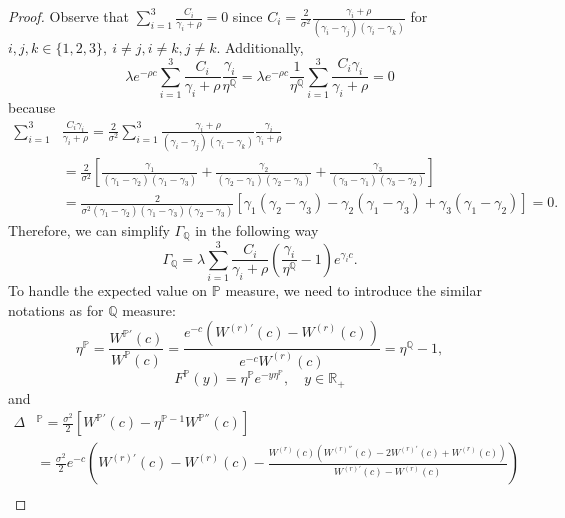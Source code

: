 \documentclass[10pt,a4paper]{amsart}
\def\P{{\mathbb{P}}}
\def\Q{{\mathbb{Q}}}
\def\P{{\mathbb P}} \def\le{\left} \def\ri{\right} \def\i{\infty}
\begin{document}
\begin{proof}
			Observe that $\sum_{i=1}^3 \frac{C_i}{\gamma_i+\rho}=0$ since $C_i = \frac{2}{\sigma^2} \frac{\gamma_i + \rho}{(\gamma_i-\gamma_j)(\gamma_i-\gamma_k)}$ for $i,j,k \in \{1,2,3\},\ i\neq j, i\neq k, j\neq k$.
			Additionally,
			\begin{equation}\label{sum_Ci_0}
				\lambda e^{-\rho c} \sum_{i=1}^{3} \frac{C_i}{\gamma_i+\rho} \frac{\gamma_i}{\eta^\Q} = \lambda e^{-\rho c} \frac{1}{\eta^\Q}\sum_{i=1}^{3} \frac{C_i \gamma_i}{\gamma_i + \rho} = 0
			\end{equation}
			because
			\begin{align*}
				\sum_{i=1}^{3} &\frac{C_i \gamma_i}{\gamma_i + \rho} = \frac{2}{\sigma^2}\sum_{i=1}^{3} \frac{\gamma_i + \rho}{(\gamma_i-\gamma_j)(\gamma_i-\gamma_k)} \frac{\gamma_i}{\gamma_i + \rho} \\
				\nonumber	&= \frac{2}{\sigma^2} \left[ \frac{\gamma_1}{(\gamma_1-\gamma_2)(\gamma_1-\gamma_3)} + \frac{\gamma_2}{(\gamma_2-\gamma_1)(\gamma_2-\gamma_3)} + \frac{\gamma_3}{(\gamma_3-\gamma_1)(\gamma_3-\gamma_2)} \right] \\
				\nonumber	&= \frac{2}{\sigma^2(\gamma_1-\gamma_2)(\gamma_1-\gamma_3)(\gamma_2-\gamma_3)} [ \gamma_1(\gamma_2-\gamma_3) - \gamma_2(\gamma_1-\gamma_3) + \gamma_3(\gamma_1-\gamma_2) ] = 0.
			\end{align*}
			Therefore, we can simplify $\Gamma_\Q$ in the following way
			\begin{equation}\label{def_Gamma}
				\Gamma_\Q =	\lambda  \sum_{i=1}^3 \frac{C_i}{\gamma_i + \rho} \left( \frac{\gamma_i}{\eta^\Q} - 1\right)e^{\gamma_i c}.
			\end{equation}
			To handle the expected value on $\P$ measure, we need to introduce the similar notations as for $\Q$ measure:
			\begin{equation*}
				\eta^\P = \frac{W^{\P'}(c)}{W^{\P}(c)} = \frac{e^{-c}\left( W^{(r)'}(c) - W^{(r)}(c) \right)}{e^{-c}W^{(r)}(c)} = \eta^\Q - 1,
			\end{equation*}
			\begin{equation*}
				F^\P(y) = \eta^\P e^{-y\eta^\P},\quad y \in \mathbb{R}_+
			\end{equation*}
			and
			\begin{align*}
				\Delta&^\P = \frac{\sigma^2}{2}\left[ W^{\P'}(c) - \eta^{\P-1}W^{\P''}(c) \right] \\
				\nonumber &= \frac{\sigma^2}{2} e^{-c} \left( W^{(r)'}(c) - W^{(r)}(c) - \frac{W^{(r)}(c)\left( W^{(r)''}(c) - 2W^{(r)'}(c) + W^{(r)}(c) \right)}{W^{(r)'}(c) - W^{(r)}(c)} \right) \\

\end{align*}
\end{proof}
\end{document}
